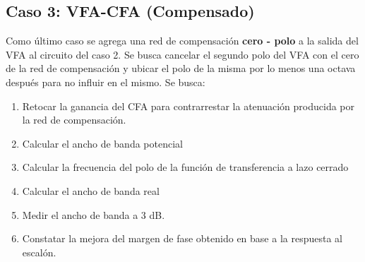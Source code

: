 \subsection{Caso 3: VFA-CFA (Compensado)}
Como último caso se agrega una red de compensación \textbf{cero - polo} a la salida del VFA al circuito del caso 2. Se busca cancelar el segundo polo del VFA con el cero de la red de compensación y ubicar el polo de la misma por lo menos una octava después para no influir en el mismo. Se busca:

\begin{enumerate}
    \item Retocar la ganancia del CFA para contrarrestar la atenuación producida por la red de compensación.
    \item Calcular el ancho de banda potencial
    \item Calcular la frecuencia del polo de la función de transferencia a lazo cerrado
    \item Calcular el ancho de banda real
    \item Medir el ancho de banda a 3 dB.
    \item Constatar la mejora del margen de fase obtenido en base a la respuesta al escalón.
\end{enumerate}


